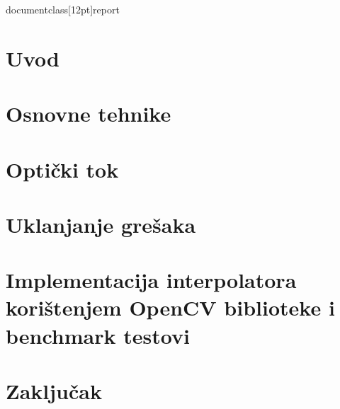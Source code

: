 
documentclass[12pt]{report}

\usepackage[utf8]{inputenc}
\usepackage{graphicx}
\usepackage[T1]{fontenc}
\usepackage{lipsum}
\usepackage[hidelinks]{hyperref}
\usepackage{textcomp}
\usepackage{color}
\usepackage{gensymb}
\usepackage{amsmath} %

\graphicspath{{images/}}

\makeatletter
\def\@makechapterhead#1{%
  \vspace*{50\p@}%
  {\parindent \z@ \raggedright \normalfont
    \interlinepenalty\@M
    \Huge \bfseries #1\par\nobreak
    \vskip 40\p@
  }}
\def\@makeschapterhead#1{%
  \vspace*{50\p@}%
  {\parindent \z@ \raggedright
    \normalfont
    \interlinepenalty\@M
    \Huge  \bfseries  #1\par\nobreak
    \vskip 40\p@
  }}
\makeatother

\newcommand{\ch}{č}
\newcommand{\CH}{Č}
\newcommand{\cj}{ć}
\newcommand{\CJ}{Ć}
\newcommand{\sh}{š}
\newcommand{\SH}{Š}
\newcommand{\zh}{ž}
\newcommand{\ZH}{Ž}

\newcommand{\midtilde}{\raisebox{0.6ex}{\texttildelow}} %
\renewcommand{\contentsname}{Sadr\zh aj}



\tableofcontents

\chapter{Uvod}


\chapter{Osnovne tehnike}


\chapter{Opti\ch ki tok}


\chapter{Uklanjanje gre\sh aka}


\chapter{Implementacija interpolatora kori\sh tenjem OpenCV biblioteke i benchmark testovi}

\chapter{Zaklju\ch ak}


